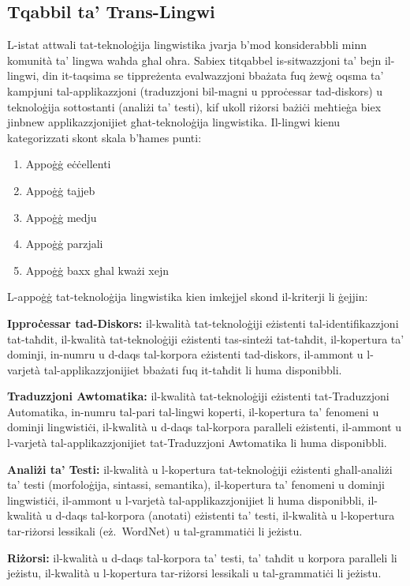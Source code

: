 \begin{multicols}{2}
\subsection{Tqabbil ta’ Trans-Lingwi }

L-istat attwali tat-teknoloġija lingwistika jvarja b’mod konsiderabbli minn komunità ta’ lingwa waħda għal oħra. Sabiex titqabbel is-sitwazzjoni ta’ bejn il-lingwi, din it-taqsima se tippreżenta evalwazzjoni bbażata fuq żewġ oqsma ta’ kampjuni tal-applikazzjoni (traduzzjoni bil-magni u pproċessar tad-diskors) u teknoloġija sottostanti (analiżi ta’ testi), kif ukoll riżorsi bażiċi meħtieġa biex jinbnew applikazzjonijiet għat-teknoloġija lingwistika. 
Il-lingwi kienu kategorizzati skont skala b'ħames punti:

\begin{enumerate}
\item Appoġġ eċċellenti
\item Appoġġ tajjeb
\item Appoġġ medju
\item Appoġġ parzjali
\item Appoġġ baxx għal kważi xejn
\end{enumerate}

L-appoġġ tat-teknoloġija lingwistika kien imkejjel skond il-kriterji li ġejjin:

\textbf{Ipproċessar tad-Diskors:} il-kwalità tat-teknoloġiji eżistenti tal-identifikazzjoni tat-taħdit, il-kwalità tat-teknoloġiji eżistenti tas-sinteżi tat-taħdit, il-kopertura ta' dominji, in-numru u d-daqs tal-korpora eżistenti tad-diskors, il-ammont u l-varjetà tal-applikazzjonijiet bbażati fuq it-taħdit li huma disponibbli.

\textbf{Traduzzjoni Awtomatika:} il-kwalità tat-teknoloġiji eżistenti tat-Traduzzjoni Automatika, in-numru tal-pari tal-lingwi koperti, il-kopertura ta' fenomeni u dominji lingwistiċi, il-kwalità u d-daqs tal-korpora paralleli eżistenti, il-ammont u l-varjetà tal-applikazzjonijiet tat-Traduzzjoni Awtomatika li huma disponibbli.

\textbf{Analiżi ta’ Testi:} il-kwalità u l-kopertura tat-teknoloġiji eżistenti għall-analiżi ta’ testi (morfoloġija, sintassi, semantika), il-kopertura ta' fenomeni u dominji lingwistiċi, il-ammont u l-varjetà tal-applikazzjonijiet li huma disponibbli, il-kwalità u d-daqs tal-korpora (anotati) eżistenti ta’ testi, il-kwalità u l-kopertura tar-riżorsi lessikali (eż.~WordNet) u tal-grammatiċi li jeżistu.

\textbf{Riżorsi:} il-kwalità u d-daqs tal-korpora ta’ testi, ta’ taħdit u korpora paralleli li jeżistu, il-kwalità u l-kopertura tar-riżorsi lessikali u tal-grammatiċi li jeżistu.


\end{multicols}
